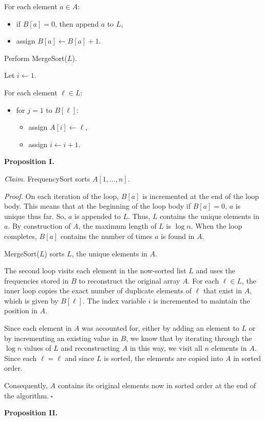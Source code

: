 \begin{enumerate}
\begin{solution}
For each element $a\in A$:
\begin{itemize}
\item if $B[a]=0$, then append $a$ to $L$,
\item assign $B[a]\leftarrow B[a]+1$.
\end{itemize}

Perform {\sc MergeSort}($L$).

Let $i\leftarrow 1$.

For each element $\ell\in L$:
\begin{itemize}
\item for $j=1$ to $B[\ell]$:
\begin{itemize}
\item assign $A[i]\leftarrow\ell$,
\item assign $i\leftarrow i+1$.
\end{itemize}
\end{itemize}
\textbf{Proposition I. }

\textit{Claim. }{\sc FrequencySort} sorts $A[1,\dots,n]$.

\textit{Proof. }On each iteration of the loop, $B[a]$ is incremented at the end of the loop body. This means that at the beginning of the loop body if $B[a]=0$, $a$ is unique thus far. So, $a$ is appended to $L$. Thus, $L$ contains the unique elements in $a$. By construction of $A$, the maximum length of $L$ is $\log n$. When the loop completes, $B[a]$ contains the number of times $a$ is found in $A$.

{\sc MergeSort}($L$) sorts $L$, the unique elements in $A$.

The second loop visits each element in the now-sorted list $L$ and uses the frequencies stored in $B$ to reconstruct the original array $A$. For each $\ell\in L$, the inner loop copies the exact number of duplicate elements of $\ell$ that exist in $A$, which is given by $B[\ell]$. The index variable $i$ is incremented to maintain the position in $A$. 

Since each element in $A$ was accounted for, either by adding an element to $L$ or by incrementing an existing value in $B$, we know that by iterating through the $\log n$ values of $L$ and reconstructing $A$ in this way, we visit all $n$ elements in $A$. Since each $\ell=\ell$ and since $L$ is sorted, the elements are copied into $A$ in sorted order.

Consequently, $A$ contains its original elements now in sorted order at the end of the algorithm.$~\square$

\textbf{Proposition II. }


\end{solution}
\end{enumerate}
